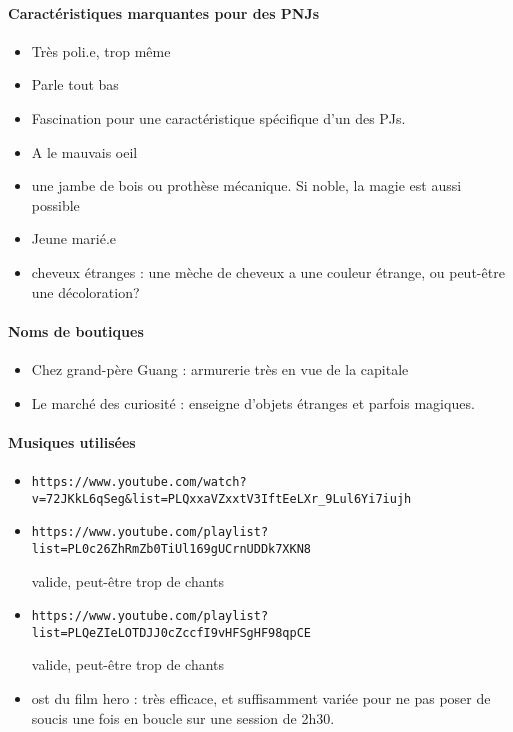 \documentclass[10pt,a4paper]{book}
\begin{document}
\paragraph{Caractéristiques marquantes pour des PNJs}
\begin{itemize}
\item Très poli.e, trop même
\item Parle tout bas
\item Fascination pour une caractéristique spécifique d'un des PJs.
\item A le mauvais oeil
\item une jambe de bois ou prothèse mécanique. Si noble, la magie est aussi possible
\item Jeune marié.e
\item cheveux étranges : une mèche de cheveux a une couleur étrange, ou peut-être une décoloration?
\end{itemize}
\paragraph{Noms de boutiques}
\begin{itemize}
\item Chez grand-père Guang : armurerie très en vue de la capitale
\item Le marché des curiosité : enseigne d'objets étranges et parfois magiques.
\end{itemize}
\paragraph{Musiques utilisées}
\begin{itemize}
\item \begin{verbatim}https://www.youtube.com/watch?v=72JKkL6qSeg&list=PLQxxaVZxxtV3IftEeLXr_9Lul6Yi7iujh \end{verbatim}
\item \begin{verbatim}https://www.youtube.com/playlist?list=PL0c26ZhRmZb0TiUl169gUCrnUDDk7XKN8\end{verbatim} valide, peut-être trop de chants
\item \begin{verbatim}https://www.youtube.com/playlist?list=PLQeZIeLOTDJJ0cZccfI9vHFSgHF98qpCE\end{verbatim} valide, peut-être trop de chants
\item ost du film hero : très efficace, et suffisamment variée pour ne pas poser de soucis une fois en boucle sur une session de 2h30.
\end{itemize}
\end{document}
